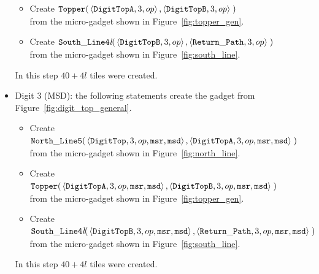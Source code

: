 \begin{itemize}
\begin{itemize}
            \item Create
            $\begin{aligned}[t]
                {\tt Topper}(& \left\langle {\tt DigitTopA}, 3, op  \right\rangle,
                               \left\langle {\tt DigitTopB}, 3, op  \right\rangle \;)
            \end{aligned}$\\from the micro-gadget shown in Figure~\ref{fig:topper_gen}.

            \item Create
            $\begin{aligned}[t]
                {\tt South\_Line4\textit{l}}(& \left\langle {\tt DigitTopB}, 3, op \right\rangle,
                                               \left\langle {\tt Return\_Path},     3, op \right\rangle \;)
            \end{aligned}$\\from the micro-gadget shown in Figure~\ref{fig:south_line}.
        \end{itemize}
        In this step $40 + 4l$ tiles were created.
        \vspace{1cm}


        \item Digit 3 (MSD): the following statements create the gadget from Figure~\ref{fig:digit_top_general}.
        \begin{itemize}
            \item Create
            $\begin{aligned}[t]
                {\tt North\_Line5}(& \left\langle {\tt DigitTop},  3, op, {\tt msr}, {\tt msd}\right\rangle,
                                     \left\langle {\tt DigitTopA}, 3, op, {\tt msr}, {\tt msd}\right\rangle \;)
            \end{aligned}$\\from the micro-gadget shown in Figure~\ref{fig:north_line}.

            \item Create
            $\begin{aligned}[t]
                {\tt Topper}(& \left\langle {\tt DigitTopA}, 3, op, {\tt msr}, {\tt msd}\right\rangle,
                               \left\langle {\tt DigitTopB}, 3, op, {\tt msr}, {\tt msd}\right\rangle \;)
            \end{aligned}$\\ from the micro-gadget shown in Figure~\ref{fig:topper_gen}.


            \item Create
            $\begin{aligned}[t]
                {\tt South\_Line4\textit{l}}(& \left\langle {\tt DigitTopB}, 3, op, {\tt msr}, {\tt msd}\right\rangle,
                                               \left\langle {\tt Return\_Path},     3, op, {\tt msr}, {\tt msd}\right\rangle \;)
            \end{aligned}$\\ from the micro-gadget shown in Figure~\ref{fig:south_line}.
        \end{itemize}
        In this step $40 + 4l$ tiles were created.
    \end{itemize}

